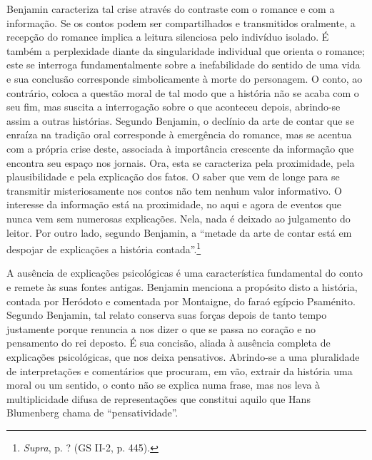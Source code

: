 Benjamin caracteriza tal crise através do contraste com o romance e com
a informação. Se os contos podem ser compartilhados e transmitidos
oralmente, a recepção do romance implica a leitura silenciosa pelo
indivíduo isolado. É também a perplexidade diante da singularidade
individual que orienta o romance; este se interroga fundamentalmente
sobre a inefabilidade do sentido de uma vida e sua conclusão corresponde
simbolicamente à morte do personagem. O conto, ao contrário, coloca a
questão moral de tal modo que a história não se acaba com o seu fim, mas
suscita a interrogação sobre o que aconteceu depois, abrindo-se assim a
outras histórias. Segundo Benjamin, o declínio da arte de contar que se
enraíza na tradição oral corresponde à emergência do romance, mas se
acentua com a própria crise deste, associada à importância crescente da
informação que encontra seu espaço nos jornais. Ora, esta se caracteriza
pela proximidade, pela plausibilidade e pela explicação dos fatos. O
saber que vem de longe para se transmitir misteriosamente nos contos não
tem nenhum valor informativo. O interesse da informação está na
proximidade, no aqui e agora de eventos que nunca vem sem numerosas
explicações. Nela, nada é deixado ao julgamento do leitor. Por outro
lado, segundo Benjamin, a ``metade da arte de contar está em despojar de
explicações a história contada''.\footnote{\emph{Supra}, p. ? (GS II-2,
  p. 445).}

A ausência de explicações psicológicas é uma característica fundamental
do conto e remete às suas fontes antigas. Benjamin menciona a propósito
disto a história, contada por Heródoto e comentada por Montaigne, do
faraó egípcio Psaménito. Segundo Benjamin, tal relato conserva suas
forças depois de tanto tempo justamente porque renuncia a nos dizer o
que se passa no coração e no pensamento do rei deposto. É sua concisão,
aliada à ausência completa de explicações psicológicas, que nos deixa
pensativos. Abrindo-se a uma pluralidade de interpretações e comentários
que procuram, em vão, extrair da história uma moral ou um sentido, o
conto não se explica numa frase, mas nos leva à multiplicidade difusa de
representações que constitui aquilo que Hans Blumenberg chama de
``pensatividade''.


